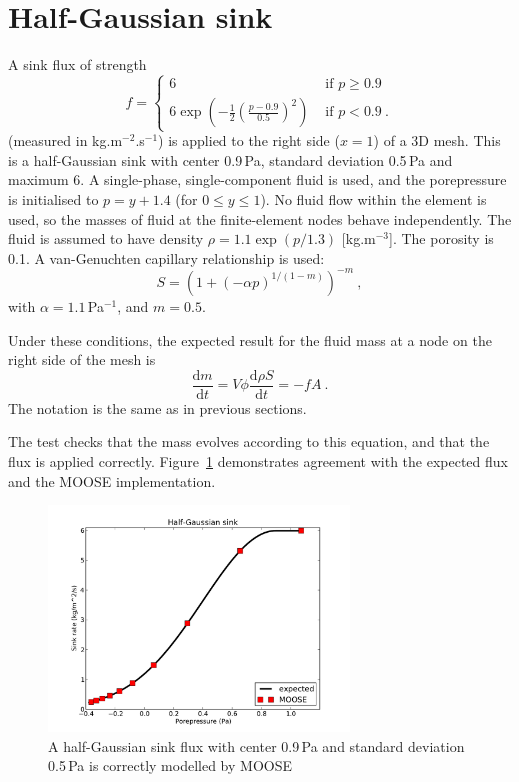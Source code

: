 \documentclass[]{scrreprt}
\def\d{\mathrm{d}}
\begin{document}
\section{Half-Gaussian sink}
\label{half_gaussian.sec}

A sink flux of strength
\begin{equation}
f = \left\{
\begin{array}{ll}
6 & \mbox{ if } p \geq 0.9 \\
6\exp\left(-\frac{1}{2} \left(\frac{p-0.9}{0.5} \right)^{2}\right) & \mbox { if } p < 0.9 \ .
\end{array}
\right.
\end{equation}
(measured in kg.m$^{-2}$.s$^{-1}$) is applied to the right side
($x=1$) of a 3D mesh.  This is a half-Gaussian sink with center
0.9\,Pa, standard deviation 0.5\,Pa and maximum 6.  A single-phase,
single-component fluid is used, and the porepressure is initialised to
$p=y+1.4$ (for $0\leq y \leq 1$).  No fluid flow within the element is
used, so the masses of fluid at the finite-element nodes behave
independently.  The fluid is assumed to have density $\rho = 1.1
\exp(p/1.3)$ [kg.m$^{-3}$].  The porosity is 0.1.  A van-Genuchten capillary
relationship is used:
\begin{equation}
S = \left( 1 + (-\alpha p)^{1/(1-m)} \right)^{-m} \ ,
\end{equation}
with $\alpha = 1.1$\,Pa$^{-1}$, and $m=0.5$.  

Under these conditions, the expected result for the fluid mass at a
node on the right side of the mesh is
\begin{equation}
\frac{\d m}{\d t} = V\phi \frac{\d \rho S}{\d t} = -f A \ .
\end{equation}
The notation is the same as in previous sections.

The test checks that the mass evolves according to this equation, and
that the flux is applied correctly.  Figure~\ref{s05.fig} demonstrates
agreement with the expected flux and the MOOSE implementation.

\begin{figure}[htb]
\begin{center}
\includegraphics[width=8cm]{s05.pdf}
\caption{A half-Gaussian sink flux with center 0.9\,Pa and standard
  deviation 0.5\,Pa is correctly modelled by MOOSE}
\label{s05.fig}
\end{center}
\end{figure}
\end{document}

